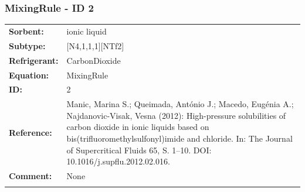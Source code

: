 \subsubsection{MixingRule - ID 2}
%
\begin{tabular}[l]{|lp{11.5cm}|}
\hline
\addlinespace

\textbf{Sorbent:} & ionic liquid \\
\textbf{Subtype:} & [N4,1,1,1][NTf2] \\
\textbf{Refrigerant:} & CarbonDioxide \\
\textbf{Equation:} & MixingRule \\
\textbf{ID:} & 2 \\
\textbf{Reference:} & Manic, Marina S.; Queimada, António J.; Macedo, Eugénia A.; Najdanovic-Visak, Vesna (2012): High-pressure solubilities of carbon dioxide in ionic liquids based on bis(trifluoromethylsulfonyl)imide and chloride. In: The Journal of Supercritical Fluids 65, S. 1–10. DOI: 10.1016/j.supflu.2012.02.016. \\
\textbf{Comment:} & None \\

\addlinespace
\hline
\end{tabular}
\newline

